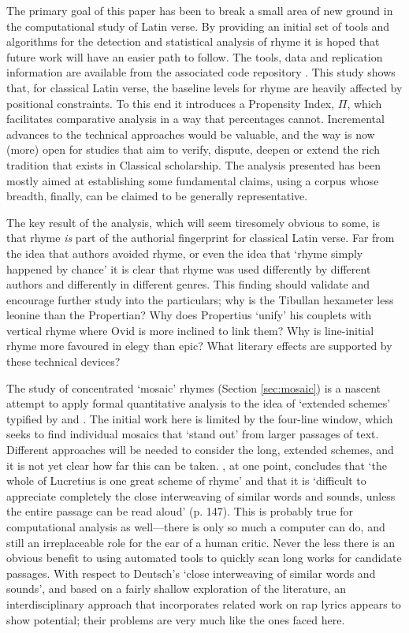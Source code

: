 \documentclass[twocolumn, switch]{article} %
\begin{document}
The primary goal of this paper has been to break a small area of new ground in
the computational study of Latin verse. By providing an initial set of tools
and algorithms for the detection and statistical analysis of rhyme it is hoped
that future work will have an easier path to follow. The tools, data and
replication information are available from the associated code repository
\cite{nagy_rhyme_2021}. This study shows that, for classical Latin verse, the
baseline levels for rhyme are heavily affected by positional constraints. To
this end it introduces a Propensity Index, $\Pi$, which facilitates
comparative analysis in a way that percentages cannot. Incremental advances to
the technical approaches would be valuable, and the way is now (more) open for
studies that aim to verify, dispute, deepen or extend the rich tradition that
exists in Classical scholarship. The analysis presented has been mostly aimed
at establishing some fundamental claims, using a corpus whose breadth, finally,
can be claimed to be generally representative.

The key result of the analysis, which will seem tiresomely obvious to some, is
that rhyme \emph{is} part of the authorial fingerprint for classical Latin
verse. Far from the idea that authors avoided rhyme, or even the idea that
`rhyme simply happened by chance' it is clear that rhyme was used differently
by different authors and differently in different genres. This finding should
validate and encourage further study into the particulars; why is the Tibullan
hexameter less leonine than the Propertian? Why does Propertius `unify' his
couplets with vertical rhyme where Ovid is more inclined to link them? Why is
line-initial rhyme more favoured in elegy than epic? What literary effects are
supported by these technical devices? 

The study of concentrated `mosaic' rhymes (Section \ref{sec:mosaic}) is a
nascent attempt to apply formal quantitative analysis to the idea of `extended
schemes' typified by  and .
 The initial work here is limited by the four-line window, which seeks to find
individual mosaics that `stand out' from larger passages of text. Different
approaches will be needed to consider the long, extended schemes, and it is
not yet clear how far this can be taken. , at one
point, concludes that `the whole of Lucretius is one great scheme of rhyme'
and that it is `difficult to appreciate completely the close interweaving of
similar words and sounds, unless the entire passage can be read aloud' (p.
147). This is probably true for computational analysis as well---there is only
so much a computer can do, and still an irreplaceable role for the ear of a
human critic. Never the less there is an obvious benefit to using automated
tools to quickly scan long works for candidate passages. With respect to
Deutsch's `close interweaving of similar words and sounds', and based on a
fairly shallow exploration of the literature, an interdisciplinary approach
that incorporates related work on rap lyrics appears to show potential; their
problems are very much like the ones faced here.
\end{document}

